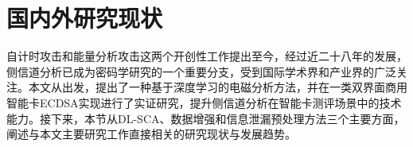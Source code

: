 {{	%
}
	
	\section{国内外研究现状}
	
	自计时攻击\citep{Kocher96}和能量分析攻击\citep{KocherJJ99}这两个开创性工作提出至今，经过近二十八年的发展，侧信道分析已成为密码学研究的一个重要分支，受到国际学术界和产业界的广泛关注。本文从\jiaodu 出发，提出了一种基于深度学习的电磁分析方法，并在一类双界面商用智能卡ECDSA实现进行了实证研究，提升侧信道分析在智能卡测评场景中的技术能力。接下来，本节从DL-SCA、数据增强和信息泄漏预处理方法三个主要方面，阐述与本文主要研究工作直接相关的研究现状与发展趋势。
}

